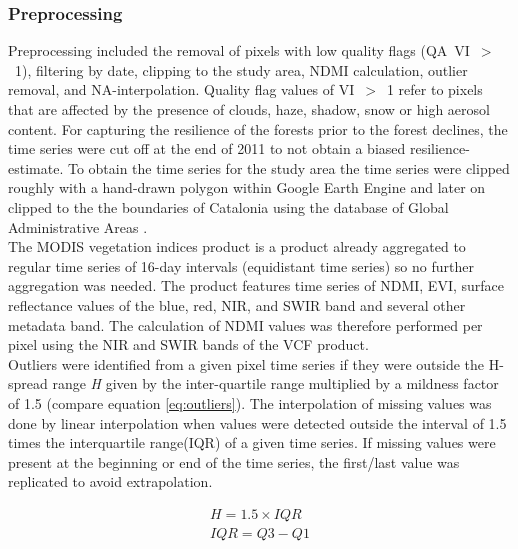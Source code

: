 \subsubsection{Preprocessing}
Preprocessing included the removal of pixels with low quality flags (QA~VI~$>$~1), filtering by date, clipping to the study area, NDMI calculation, outlier removal, and NA-interpolation. Quality flag values of VI~$>$~1 refer to pixels that are affected by the presence of clouds, haze, shadow, snow or high aerosol content. For capturing the resilience of the forests prior to the forest declines, the time series were cut off at the end of 2011 to not obtain a biased resilience-estimate. To obtain the time series for the study area the time series were clipped roughly with a hand-drawn polygon within Google Earth Engine and later on clipped to the the boundaries of Catalonia using the database of Global Administrative Areas \citep[GADM, see][]{gadm}.\\
The MODIS vegetation indices product \citep[VCF,][]{modisvcf} is a product already aggregated to regular time series of 16-day intervals (equidistant time series) so no further aggregation was needed. The product features time series of NDMI, EVI, surface reflectance values of the blue, red, NIR, and SWIR band and several other metadata band. The calculation of NDMI values was therefore performed per pixel using the NIR and SWIR bands of the VCF product.\\
Outliers were identified from a given pixel time series if they were outside the H-spread range \textit{H} given by the inter-quartile range multiplied by a mildness factor of 1.5 (compare equation \ref{eq:outliers}). The interpolation of missing values was done by linear interpolation when values were detected outside the interval of 1.5 times the interquartile range(IQR) of a given time series. If missing values were present at the beginning or end of the time series, the first/last value was replicated to avoid extrapolation.

\begin{equation}\label{eq:outliers}
\begin{aligned}
	H = 1.5 \times IQR\\
	IQR = Q3 - Q1
\end{aligned}
\end{equation}\\


